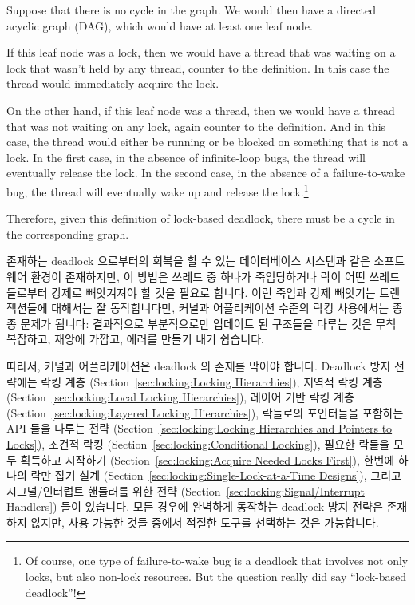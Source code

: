 {	Suppose that there is no cycle in the graph.
	We would then have a directed acyclic graph (DAG), which would
	have at least one leaf node.

	If this leaf node was a lock, then we would have a thread
	that was waiting on a lock that wasn't held by any thread,
	counter to the definition.
	In this case the thread would immediately acquire the lock.

	On the other hand, if this leaf node was a thread, then
	we would have a thread that was not waiting on any lock,
	again counter to the definition.
	And in this case, the thread would either be running or
	be blocked on something that is not a lock.
	In the first case, in the absence of infinite-loop bugs,
	the thread will eventually release the lock.
	In the second case, in the absence of a failure-to-wake bug,
	the thread will eventually wake up and release the lock.\footnote{
		Of course, one type of failure-to-wake bug is a
		deadlock that involves not only locks, but also non-lock
		resources.
		But the question really did say ``lock-based deadlock''!}

	Therefore, given this definition of lock-based deadlock, there
	must be a cycle in the corresponding graph.

	\fi

}\QuickQuizEnd

존재하는 deadlock 으로부터의 회복을 할 수 있는 데이터베이스 시스템과 같은
소프트웨어 환경이 존재하지만, 이 방법은 쓰레드 중 하나가 죽임당하거나 락이 어떤
쓰레드들로부터 강제로 빼앗겨져야 할 것을 필요로 합니다.
이런 죽임과 강제 빼앗기는 트랜잭션들에 대해서는 잘 동작합니다만, 커널과
어플리케이션 수준의 락킹 사용에서는 종종 문제가 됩니다: 결과적으로 부분적으로만
업데이트 된 구조들을 다루는 것은 무척 복잡하고, 재앙에 가깝고, 에러를 만들기
내기 쉽습니다.

따라서, 커널과 어플리케이션은 deadlock 의 존재를 막아야 합니다.
Deadlock 방지 전략에는 락킹 계층
(Section~\ref{sec:locking:Locking Hierarchies}),
지역적 락킹 계층
(Section~\ref{sec:locking:Local Locking Hierarchies}),
레이어 기반 락킹 계층
(Section~\ref{sec:locking:Layered Locking Hierarchies}),
락들로의 포인터들을 포함하는 API 들을 다루는 전략
(Section~\ref{sec:locking:Locking Hierarchies and Pointers to Locks}),
조건적 락킹
(Section~\ref{sec:locking:Conditional Locking}),
필요한 락들을 모두 획득하고 시작하기
(Section~\ref{sec:locking:Acquire Needed Locks First}),
한번에 하나의 락만 잡기 설계
(Section~\ref{sec:locking:Single-Lock-at-a-Time Designs}),
그리고 시그널/인터럽트 핸들러를 위한 전략
(Section~\ref{sec:locking:Signal/Interrupt Handlers}) 들이 있습니다.
모든 경우에 완벽하게 동작하는 deadlock 방지 전략은 존재하지 않지만, 사용 가능한
것들 중에서 적절한 도구를 선택하는 것은 가능합니다.

